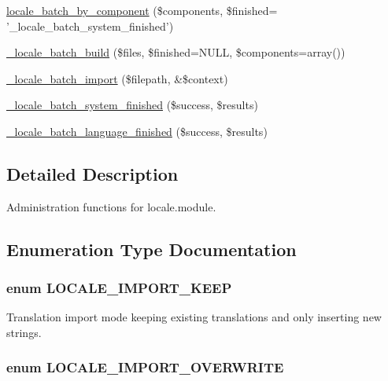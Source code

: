 \begin{CompactItemize}
\item 
\hyperlink{group__locale_ga6ec98b4c2d6b82b6f206bafcf7d2ce6}{locale\_\-batch\_\-by\_\-component} (\$components, \$finished= '\_\-locale\_\-batch\_\-system\_\-finished')
\item 
\hyperlink{group__locale_g4f10893e8ed214fe4739b9415a06948a}{\_\-locale\_\-batch\_\-build} (\$files, \$finished=NULL, \$components=array())
\item 
\hyperlink{group__locale_g97c8b79262e3aa8af4e5ea3b7908b99b}{\_\-locale\_\-batch\_\-import} (\$filepath, \&\$context)
\item 
\hyperlink{group__locale_g3b7cc14a5735d2aee066dd4f6bb517b8}{\_\-locale\_\-batch\_\-system\_\-finished} (\$success, \$results)
\item 
\hyperlink{group__locale_g06bd6310727083246869907515bea547}{\_\-locale\_\-batch\_\-language\_\-finished} (\$success, \$results)
\end{CompactItemize}


\subsection{Detailed Description}
Administration functions for locale.module. 

\subsection{Enumeration Type Documentation}
\hypertarget{locale_8inc_303136b14da01d0bdb7088444b3da25e}{
\subsubsection[{LOCALE\_\-IMPORT\_\-KEEP}]{\setlength{\rightskip}{0pt plus 5cm}enum {\bf LOCALE\_\-IMPORT\_\-KEEP}}}
\label{locale_8inc_303136b14da01d0bdb7088444b3da25e}


Translation import mode keeping existing translations and only inserting new strings. \hypertarget{locale_8inc_fd5557a8da0f5c5b4f1965609c9488d5}{
\subsubsection[{LOCALE\_\-IMPORT\_\-OVERWRITE}]{\setlength{\rightskip}{0pt plus 5cm}enum {\bf LOCALE\_\-IMPORT\_\-OVERWRITE}}}
\label{locale_8inc_fd5557a8da0f5c5b4f1965609c9488d5}


